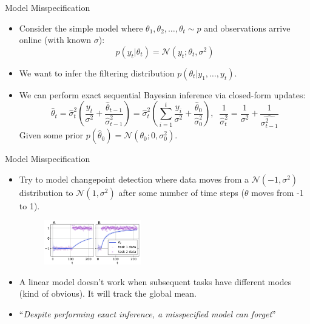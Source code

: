 \documentclass[12pt,aspectratio=169, handout]{beamer}
\let\olditem\item
\renewcommand\item{\olditem\justifying}
\begin{document}
\begin{frame}{Model Misspecification}
\begin{itemize}
    \item Consider the simple model where $\theta_1, \theta_2, \ldots, \theta_t \sim p$ and observations arrive online (with known $\sigma$):
    $$p(y_t | \theta_t) = \mathcal{N}(y_t; \theta_t, \sigma^2)$$
    \pause
    \item We want to infer the filtering distribution $p(\theta_t | y_1,\ldots,y_t)$.
    \pause
    \item We can perform exact sequential Bayesian inference via closed-form updates:
    $$\hat{\theta}_t = \hat{\sigma}_t^2 \left( \frac{y_t}{\sigma^2} + \frac{\hat{\theta}_{t-1}}{\hat{\sigma}_{t-1}^2}  \right) = \hat{\sigma}_t^2 \left( \sum_{i=1}^t \frac{y_i}{\sigma^2} + \frac{\hat{\theta}_{0}}{\hat{\sigma}_{0}^2}  \right), \;\; \frac{1}{\hat{\sigma}_t^2} = \frac{1}{\sigma^2} + \frac{1}{\hat{\sigma_{t-1}^2}}$$
    Given some prior $p(\hat{\theta}_0) = \mathcal{N}(\theta_0; 0, \sigma_0^2)$.
\end{itemize}

\end{frame}

\begin{frame}{Model Misspecification}
\begin{itemize}[<+->]

    \item Try to model changepoint detection where data moves from a $\mathcal{N}(-1,\sigma^2)$ distribution to $\mathcal{N}(1,\sigma^2)$ after some number of time steps ($\theta$ moves from -1 to 1).
    \pause
    \begin{figure}
        \centering
        \includegraphics[width=0.4\textwidth]{"images/Fig4_pic.png"}
    \end{figure}
    
    \item A linear model doesn't work when subsequent tasks have different modes (kind of obvious). It will track the global mean.
    \item ``\textit{Despite performing exact inference, a misspecified model can forget}''
\end{itemize}

\end{frame}
\end{document}
